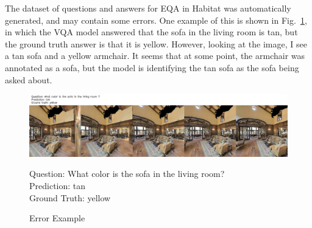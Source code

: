 The dataset of questions and answers for EQA in Habitat was automatically generated, and may contain some errors. One example of this is shown in Fig.~\ref{fig:err_ex}, in which the VQA model answered that the sofa in the living room is tan, but the ground truth answer is that it is yellow. However, looking at the image, I see a tan sofa and a yellow armchair. It seems that at some point, the armchair was annotated as a sofa, but the model is identifying the tan sofa as the sofa being asked about. 

\begin{figure}[h]
	\centering
	\includegraphics[width=\textwidth]{./figure/error_images/ckpt_0_121_image.jpg}
	\captionsetup{justification=raggedright, textfont=footnotesize}
	\caption*{Question: What color is the sofa in the living room? \\
	Prediction: tan \\
	Ground Truth: yellow}
    \captionsetup{labelfont=bf, textfont=normal,
			justification=centering,
			singlelinecheck=false}
	\caption{Error Example}
	\label{fig:err_ex}
\end{figure}




